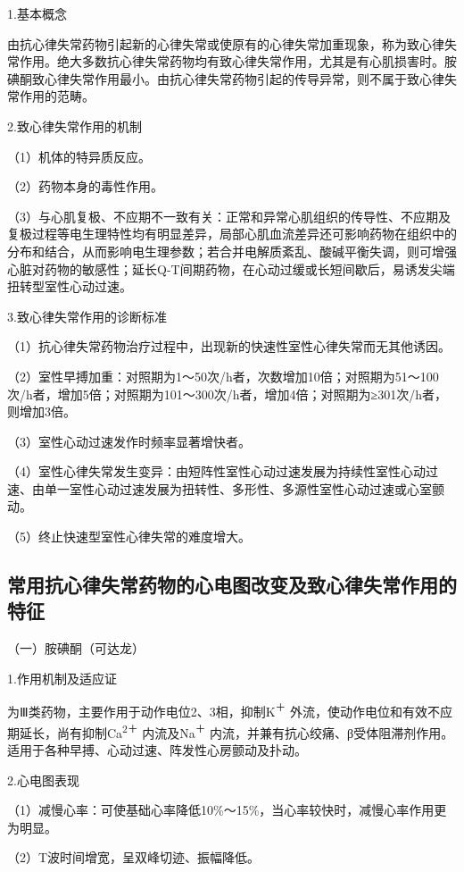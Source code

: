 1.基本概念

由抗心律失常药物引起新的心律失常或使原有的心律失常加重现象，称为致心律失常作用。绝大多数抗心律失常药物均有致心律失常作用，尤其是有心肌损害时。胺碘酮致心律失常作用最小。由抗心律失常药物引起的传导异常，则不属于致心律失常作用的范畴。

2.致心律失常作用的机制

（1）机体的特异质反应。

（2）药物本身的毒性作用。

（3）与心肌复极、不应期不一致有关：正常和异常心肌组织的传导性、不应期及复极过程等电生理特性均有明显差异，局部心肌血流差异还可影响药物在组织中的分布和结合，从而影响电生理参数；若合并电解质紊乱、酸碱平衡失调，则可增强心脏对药物的敏感性；延长Q-T间期药物，在心动过缓或长短间歇后，易诱发尖端扭转型室性心动过速。

3.致心律失常作用的诊断标准

（1）抗心律失常药物治疗过程中，出现新的快速性室性心律失常而无其他诱因。

（2）室性早搏加重：对照期为1～50次/h者，次数增加10倍；对照期为51～100次/h者，增加5倍；对照期为101～300次/h者，增加4倍；对照期为≥301次/h者，则增加3倍。

（3）室性心动过速发作时频率显著增快者。

（4）室性心律失常发生变异：由短阵性室性心动过速发展为持续性室性心动过速、由单一室性心动过速发展为扭转性、多形性、多源性室性心动过速或心室颤动。

（5）终止快速型室性心律失常的难度增大。

\protect\hypertarget{text00054.htmlux5cux23subid655}{}{}

\subsection{常用抗心律失常药物的心电图改变及致心律失常作用的特征}

（一）胺碘酮（可达龙）

1.作用机制及适应证

为Ⅲ类药物，主要作用于动作电位2、3相，抑制K\textsuperscript{＋}
外流，使动作电位和有效不应期延长，尚有抑制Ca\textsuperscript{2＋}
内流及Na\textsuperscript{＋}
内流，并兼有抗心绞痛、β受体阻滞剂作用。适用于各种早搏、心动过速、阵发性心房颤动及扑动。

2.心电图表现

（1）减慢心率：可使基础心率降低10\%～15\%，当心率较快时，减慢心率作用更为明显。

（2）T波时间增宽，呈双峰切迹、振幅降低。

